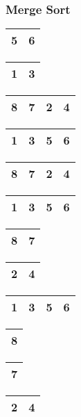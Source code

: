 \begin{frame}
\frametitle{Merge Sort}
\begin{table}
\begin{tabular}{| c | c |}
\hline
5 & 6 \\ 
\hline
\end{tabular}
\quad
\begin{tabular}{| c | c |}
\hline
\cellcolor{blue!25}1 & \cellcolor{blue!25}3 \\ 
\hline
\end{tabular}
\quad
\begin{tabular}{| c | c | c | c |}
\hline
8 & 7 & 2 & 4 \\ 
\hline
\end{tabular}
\end{table}

\begin{table}
\begin{tabular}{| c | c | c | c |}
\hline
\cellcolor{blue!25}1 & \cellcolor{blue!25}3 & \cellcolor{blue!25}5 & \cellcolor{blue!25}6 \\ 
\hline
\end{tabular}
\quad
\begin{tabular}{| c | c | c | c |}
\hline
8 & 7 & 2 & 4 \\ 
\hline
\end{tabular}
\end{table}

\begin{table}
\begin{tabular}{| c | c | c | c |}
\hline
1 & 3 & 5 & 6 \\ 
\hline
\end{tabular}
\quad
\begin{tabular}{| c | c |}
\hline
\cellcolor{blue!25}8 & \cellcolor{blue!25}7 \\ 
\hline
\end{tabular}
\quad
\begin{tabular}{| c | c |}
\hline
2 & 4 \\ 
\hline
\end{tabular}
\end{table}

\begin{table}
\begin{tabular}{| c | c | c | c |}
\hline
1 & 3 & 5 & 6 \\ 
\hline
\end{tabular}
\quad
\begin{tabular}{| c |}
\hline
\cellcolor{blue!25}8 \\ 
\hline
\end{tabular}
\quad
\begin{tabular}{| c |}
\hline
\cellcolor{blue!25}7 \\ 
\hline
\end{tabular}
\quad
\begin{tabular}{| c | c |}
\hline
2 & 4 \\ 
\hline
\end{tabular}
\end{table}
\end{frame}

